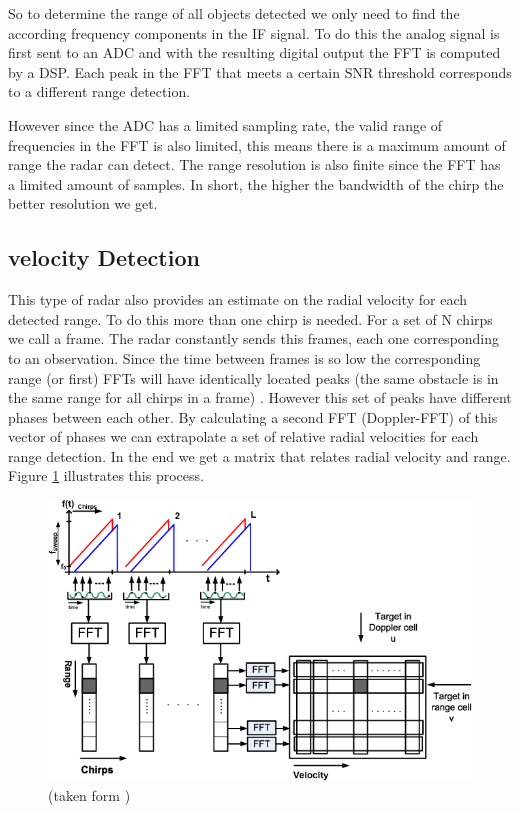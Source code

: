  So to determine the range of all objects detected we only need to find the according frequency components in the \ac{IF} signal. To do this the analog signal is first sent to an \ac{ADC} and with the resulting digital output the \ac{FFT} is computed by a \ac{DSP}. Each peak in the \ac{FFT} that meets a certain \ac{SNR} threshold corresponds to a different range detection. 
 
 However since the \ac{ADC} has a limited sampling rate, the valid range of frequencies in the \ac{FFT} is also limited, this means there is a maximum amount of range the radar can detect.
The range resolution is also finite since the \ac{FFT} has a limited amount of samples. In short, the higher the bandwidth of the chirp the better resolution we get.
 
\subsection*{velocity Detection}
This type of radar also provides an estimate on the radial velocity for each detected range. To do this more than one chirp is needed. For a set of N chirps we call a frame. The radar constantly sends this frames, each one corresponding to an observation. Since the time between frames is so low the corresponding range (or first) \ac{FFT}s will have  identically located peaks (the same obstacle is in the same range for all chirps in a frame) . However this set of peaks have different phases between each other. By calculating a second \ac{FFT} (Doppler-FFT) of this vector of phases we can extrapolate a set of relative radial velocities  for each range detection. In the end we get a matrix that relates radial velocity and range. 
Figure \ref{fig:matrix} illustrates this process.
\begin{figure}[h] 
\centerline{\includegraphics [width=0.8 \textwidth]{imgs/chapter2/dopplerFFT2.png}}
\caption{(taken form \cite{schroeder2010x})}
\label{fig:matrix}
\end{figure}
